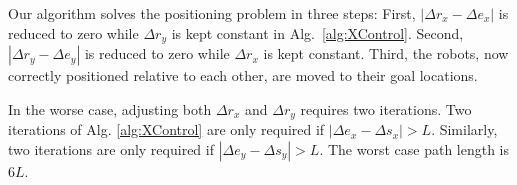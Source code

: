 Our algorithm solves the positioning problem in three steps: 
First, $|\Delta r_x - \Delta e_x |$ is reduced to zero while  $\Delta r_y$ is kept constant in Alg.~\ref{alg:XControl}. 
Second, $|\Delta r_y - \Delta e_y |$ is reduced to zero while  $\Delta r_x$ is kept constant. %
Third, the robots, now correctly positioned relative to each other, are moved to their goal locations.

In the worse case, adjusting both $\Delta r_x$ and $\Delta r_y$ requires two iterations.   Two iterations of Alg. \ref{alg:XControl} are only required if $|\Delta e_x - \Delta s_x|>L$. 
Similarly,  two iterations %
are only required if $|\Delta e_y - \Delta s_y|>L$.  The worst case path length is 6$L$.

%
